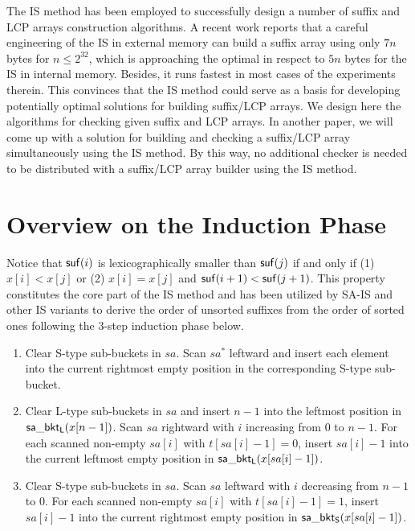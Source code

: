\documentclass[10pt,journal,compsoc]{IEEEtran}
\begin{document}
The IS method has been employed to successfully design a number of suffix and LCP arrays construction algorithms. A recent work \cite{Karkkainen2017} reports that a careful engineering of the IS in external memory can build a suffix array using only $7n$ bytes for $n\le 2^{32}$, which is approaching the optimal in respect to $5n$ bytes for the IS in internal memory. Besides, it runs fastest in most cases of the experiments therein. This convinces that the IS method could serve as a basis for developing potentially optimal solutions for building suffix/LCP arrays. We design here the algorithms for checking given suffix and LCP arrays. In another paper, we will come up with a solution for building and checking a suffix/LCP array simultaneously using the IS method. By this way, no additional checker is needed to be distributed with a suffix/LCP array builder using the IS method.





\newpage
\appendices
\section{Overview on the Induction Phase} \label{sec:appendix}

Notice that ${\sf suf}(i)$ is lexicographically smaller than ${\sf suf}(j)$ if and only if (1) $x[i] < x[j]$ or (2) $x[i] = x[j]$ and ${\sf suf}(i + 1) < {\sf suf}(j + 1)$. This property constitutes the core part of the IS method and has been utilized by SA-IS and other IS variants to derive the order of unsorted suffixes from the order of sorted ones following the 3-step induction phase below.

\begin{enumerate}[S1]
	\item 
	Clear S-type sub-buckets in $sa$. Scan $sa^*$ leftward and insert each element into the current rightmost empty position in the corresponding S-type sub-bucket.
	
	\item 
	Clear L-type sub-buckets in $sa$ and insert $n - 1$ into the leftmost position in ${\sf sa\_bkt_L}(x[n - 1])$. Scan $sa$ rightward with $i$ increasing from $0$ to $n - 1$. For each scanned non-empty $sa[i]$ with $t[sa[i] - 1] = 0$, insert $sa[i] - 1$ into the current leftmost empty position in ${\sf sa\_bkt_L}(x[sa[i] - 1])$.
	
	\item
	Clear S-type sub-buckets in $sa$. Scan $sa$ leftward with $i$ decreasing from $n - 1$ to $0$. For each scanned non-empty $sa[i]$ with $t[sa[i] - 1] = 1$, insert $sa[i] - 1$ into the current rightmost empty position in ${\sf sa\_bkt_S}(x[sa[i] - 1])$.
	
\end{enumerate}
\end{document}
